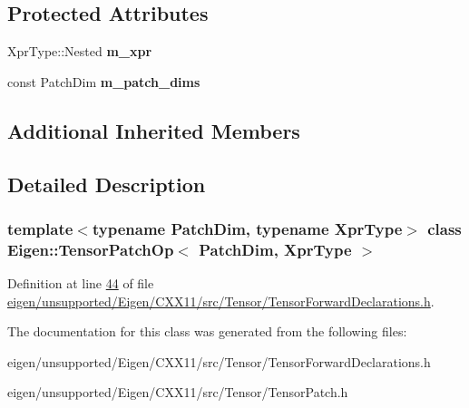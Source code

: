 \subsection*{Protected Attributes}
\begin{DoxyCompactItemize}
\item 
\mbox{\label{class_eigen_1_1_tensor_patch_op_ac9262ce1b56862dfd1ca63dcf28287ef}} 
Xpr\+Type\+::\+Nested {\bfseries m\+\_\+xpr}
\item 
\mbox{\label{class_eigen_1_1_tensor_patch_op_a2c3a6844aa75ef48bda9f113a4bb0fcb}} 
const Patch\+Dim {\bfseries m\+\_\+patch\+\_\+dims}
\end{DoxyCompactItemize}
\subsection*{Additional Inherited Members}


\subsection{Detailed Description}
\subsubsection*{template$<$typename Patch\+Dim, typename Xpr\+Type$>$\newline
class Eigen\+::\+Tensor\+Patch\+Op$<$ Patch\+Dim, Xpr\+Type $>$}



Definition at line \hyperlink{eigen_2unsupported_2_eigen_2_c_x_x11_2src_2_tensor_2_tensor_forward_declarations_8h_source_l00044}{44} of file \hyperlink{eigen_2unsupported_2_eigen_2_c_x_x11_2src_2_tensor_2_tensor_forward_declarations_8h_source}{eigen/unsupported/\+Eigen/\+C\+X\+X11/src/\+Tensor/\+Tensor\+Forward\+Declarations.\+h}.



The documentation for this class was generated from the following files\+:\begin{DoxyCompactItemize}
\item 
eigen/unsupported/\+Eigen/\+C\+X\+X11/src/\+Tensor/\+Tensor\+Forward\+Declarations.\+h\item 
eigen/unsupported/\+Eigen/\+C\+X\+X11/src/\+Tensor/\+Tensor\+Patch.\+h\end{DoxyCompactItemize}
